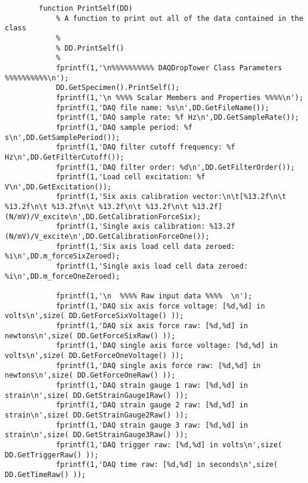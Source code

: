 \begin{lstlisting}
        function PrintSelf(DD)
            % A function to print out all of the data contained in the class
            %
            % DD.PrintSelf()
            %
            fprintf(1,'\n%%%%%%%%%% DAQDropTower Class Parameters %%%%%%%%%%\n');
            DD.GetSpecimen().PrintSelf();
            fprintf(1,'\n %%%% Scalar Members and Properties %%%%\n');
            fprintf(1,'DAQ file name: %s\n',DD.GetFileName());
            fprintf(1,'DAQ sample rate: %f Hz\n',DD.GetSampleRate());
            fprintf(1,'DAQ sample period: %f s\n',DD.GetSamplePeriod());
            fprintf(1,'DAQ filter cutoff frequency: %f Hz\n',DD.GetFilterCutoff());
            fprintf(1,'DAQ filter order: %d\n',DD.GetFilterOrder());
            fprintf(1,'Load cell excitation: %f V\n',DD.GetExcitation());
            fprintf(1,'Six axis calibration vector:\n\t[%13.2f\n\t %13.2f\n\t %13.2f\n\t %13.2f\n\t %13.2f\n\t %13.2f] (N/mV)/V_excite\n',DD.GetCalibrationForceSix);
            fprintf(1,'Single axis calibration: %13.2f (N/mV)/V_excite\n',DD.GetCalibrationForceOne());
            fprintf(1,'Six axis load cell data zeroed: %i\n',DD.m_forceSixZeroed);
            fprintf(1,'Single axis load cell data zeroed: %i\n',DD.m_forceOneZeroed);
            
            fprintf(1,'\n  %%%% Raw input data %%%%  \n');
            fprintf(1,'DAQ six axis force voltage: [%d,%d] in volts\n',size( DD.GetForceSixVoltage() ));
            fprintf(1,'DAQ six axis force raw: [%d,%d] in newtons\n',size( DD.GetForceSixRaw() ));
            fprintf(1,'DAQ single axis force voltage: [%d,%d] in volts\n',size( DD.GetForceOneVoltage() ));
            fprintf(1,'DAQ single axis force raw: [%d,%d] in newtons\n',size( DD.GetForceOneRaw() ));           
            fprintf(1,'DAQ strain gauge 1 raw: [%d,%d] in strain\n',size( DD.GetStrainGauge1Raw() ));
            fprintf(1,'DAQ strain gauge 2 raw: [%d,%d] in strain\n',size( DD.GetStrainGauge2Raw() ));
            fprintf(1,'DAQ strain gauge 3 raw: [%d,%d] in strain\n',size( DD.GetStrainGauge3Raw() ));
            fprintf(1,'DAQ trigger raw: [%d,%d] in volts\n',size( DD.GetTriggerRaw() ));
            fprintf(1,'DAQ time raw: [%d,%d] in seconds\n',size( DD.GetTimeRaw() ));
            

\end{lstlisting}
